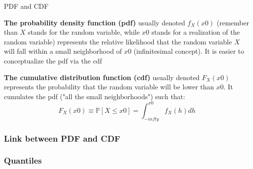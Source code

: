 \documentclass{beamer}
\newenvironment{wideitemize}{\itemize\addtolength{\itemsep}{10pt}}{\enditemize}
\begin{document}
\begin{frame}{PDF and CDF}
  \begin{wideitemize}
  \item \textbf{The probability density function (pdf)} usually denoted $f_X(x0)$ (remember than $X$ stands for the random variable, while $x0$ stands for a realization of the random variable) represents the relative likelihood that the random variable $X$ will fall within a small neighborhood of $x0$ (infinitesimal concept). It is easier to conceptualize the pdf via the cdf
  \item \textbf{The cumulative distribution function (cdf)} usually denoted $F_X(x0)$ represents the probability that the random variable will be lower than $x0$. It cumulates the pdf ("all the small neighborhoods") such that:
    \begin{equation*}
F_X(x0) \equiv \mathbb{P}[X \leq x0] = \int_{-infty}^{x0} f_X(h) dh      
    \end{equation*}    
  \end{wideitemize}  
\end{frame}


\begin{frame}
\frametitle{Link between PDF and CDF}
\end{frame}

\begin{frame}
  \frametitle{Quantiles}
\end{frame}
\end{document}

